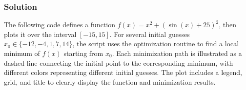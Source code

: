 \documentclass[letterpaper,10pt,english]{jupyterBook}
\begin{document}
\subsubsection{Solution}
\label{\detokenize{01:id12}}
\sphinxAtStartPar
The following code defines a function \(f(x) = x^2 + (\sin(x) + 25)^2\), then plots it over the interval \([-15, 15]\). For several initial guesses \(x_0 \in \{-12, -4, 1, 7, 14\}\), the script uses the  optimization routine  to find a local minimum of \(f(x)\) starting from \(x_0\). Each minimization path is illustrated as a dashed line connecting the initial point to the corresponding minimum, with different colors representing different initial guesses. The plot includes a legend, grid, and title to clearly display the function and minimization results.
\end{document}
